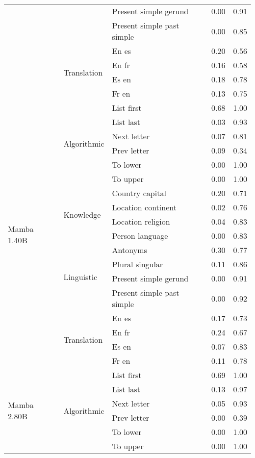 \begin{center}
\begin{longtable}{lllrr}
 &  & Present simple gerund & 0.00 & 0.91 \\
 &  & Present simple past simple & 0.00 & 0.85 \\
\cline{2-5}
 & \multirow[t]{4}{*}{Translation} & En es & 0.20 & 0.56 \\
 &  & En fr & 0.16 & 0.58 \\
 &  & Es en & 0.18 & 0.78 \\
 &  & Fr en & 0.13 & 0.75 \\
\cline{1-5} \cline{2-5}
\multirow[t]{18}{*}{Mamba 1.40B} & \multirow[t]{6}{*}{Algorithmic} & List first & 0.68 & 1.00 \\
 &  & List last & 0.03 & 0.93 \\
 &  & Next letter & 0.07 & 0.81 \\
 &  & Prev letter & 0.09 & 0.34 \\
 &  & To lower & 0.00 & 1.00 \\
 &  & To upper & 0.00 & 1.00 \\
\cline{2-5}
 & \multirow[t]{4}{*}{Knowledge} & Country capital & 0.20 & 0.71 \\
 &  & Location continent & 0.02 & 0.76 \\
 &  & Location religion & 0.04 & 0.83 \\
 &  & Person language & 0.00 & 0.83 \\
\cline{2-5}
 & \multirow[t]{4}{*}{Linguistic} & Antonyms & 0.30 & 0.77 \\
 &  & Plural singular & 0.11 & 0.86 \\
 &  & Present simple gerund & 0.00 & 0.91 \\
 &  & Present simple past simple & 0.00 & 0.92 \\
\cline{2-5}
 & \multirow[t]{4}{*}{Translation} & En es & 0.17 & 0.73 \\
 &  & En fr & 0.24 & 0.67 \\
 &  & Es en & 0.07 & 0.83 \\
 &  & Fr en & 0.11 & 0.78 \\
\cline{1-5} \cline{2-5}
\multirow[t]{18}{*}{Mamba 2.80B} & \multirow[t]{6}{*}{Algorithmic} & List first & 0.69 & 1.00 \\
 &  & List last & 0.13 & 0.97 \\
 &  & Next letter & 0.05 & 0.93 \\
 &  & Prev letter & 0.00 & 0.39 \\
 &  & To lower & 0.00 & 1.00 \\
 &  & To upper & 0.00 & 1.00 \\
\cline{2-5}

\end{longtable}
\end{center}
